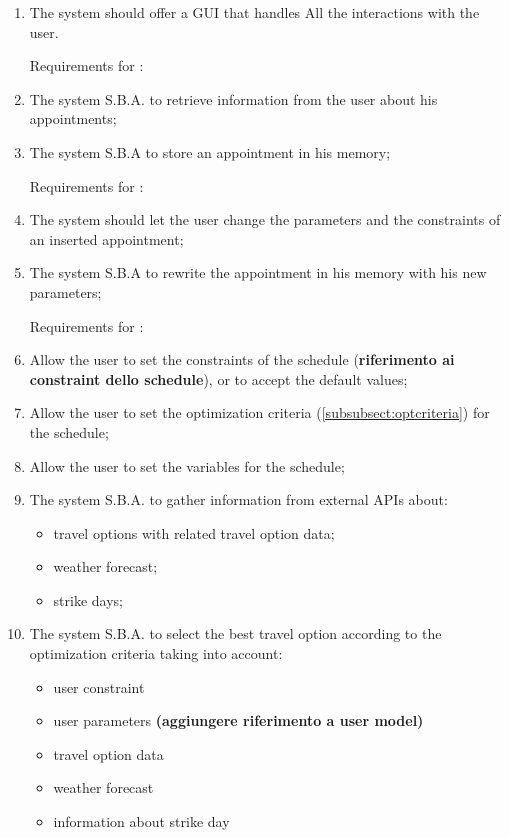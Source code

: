 \begin{enumerate}

\item The system should offer a GUI that handles All the interactions with the user.

Requirements for :

\renewcommand\labelenumi{\textbf{R\theenumi}}

\item The system S.B.A. to retrieve information from the user about his appointments; \label{req:R1}

\item The system S.B.A to store an appointment in his memory;


Requirements for :

\item The system should let the user change the parameters and the constraints of an inserted appointment; 

\item The system S.B.A to rewrite the appointment in his memory with his new parameters;

Requirements for :


\item Allow the user to set the constraints of the schedule (\textbf{riferimento ai constraint dello schedule}), or to accept the default values;
 
\item Allow the user to set the optimization criteria (\ref{subsubsect:optcriteria}) for the schedule;

\item Allow the user to set the variables for the schedule;

\item The system S.B.A. to gather information from external APIs about: 
\begin{itemize}
\item travel options with related travel option data; 
\item weather forecast;
\item strike days;
\end{itemize}

\item The system S.B.A. to select the best travel option according to the optimization criteria taking into account:
\begin{itemize}
\item user constraint
\item user parameters \textbf{(aggiungere riferimento a user model)}
\item travel option data 
\item weather forecast
\item information about strike day
\end{itemize}


\end{enumerate}
